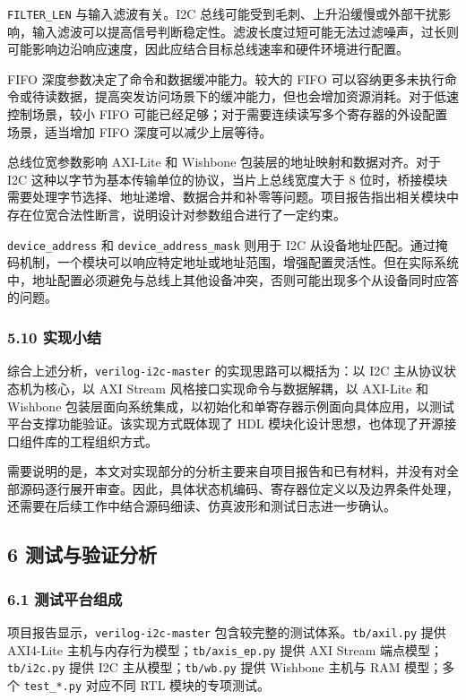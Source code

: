 \texttt{FILTER\_LEN} 与输入滤波有关。I2C 总线可能受到毛刺、上升沿缓慢或外部干扰影响，输入滤波可以提高信号判断稳定性。滤波长度过短可能无法过滤噪声，过长则可能影响边沿响应速度，因此应结合目标总线速率和硬件环境进行配置。

FIFO 深度参数决定了命令和数据缓冲能力。较大的 FIFO 可以容纳更多未执行命令或待读数据，提高突发访问场景下的缓冲能力，但也会增加资源消耗。对于低速控制场景，较小 FIFO 可能已经足够；对于需要连续读写多个寄存器的外设配置场景，适当增加 FIFO 深度可以减少上层等待。

总线位宽参数影响 AXI-Lite 和 Wishbone 包装层的地址映射和数据对齐。对于 I2C 这种以字节为基本传输单位的协议，当片上总线宽度大于 8 位时，桥接模块需要处理字节选择、地址递增、数据合并和补零等问题。项目报告指出相关模块中存在位宽合法性断言，说明设计对参数组合进行了一定约束。

\texttt{device\_address} 和 \texttt{device\_address\_mask} 则用于 I2C 从设备地址匹配。通过掩码机制，一个模块可以响应特定地址或地址范围，增强配置灵活性。但在实际系统中，地址配置必须避免与总线上其他设备冲突，否则可能出现多个从设备同时应答的问题。

\subsubsection{5.10 实现小结}\label{ux5b9eux73b0ux5c0fux7ed3}

综合上述分析，\texttt{verilog-i2c-master} 的实现思路可以概括为：以 I2C 主从协议状态机为核心，以 AXI Stream 风格接口实现命令与数据解耦，以 AXI-Lite 和 Wishbone 包装层面向系统集成，以初始化和单寄存器示例面向具体应用，以测试平台支撑功能验证。该实现方式既体现了 HDL 模块化设计思想，也体现了开源接口组件库的工程组织方式。

需要说明的是，本文对实现部分的分析主要来自项目报告和已有材料，并没有对全部源码逐行展开审查。因此，具体状态机编码、寄存器位定义以及边界条件处理，还需要在后续工作中结合源码细读、仿真波形和测试日志进一步确认。

\subsection{6 测试与验证分析}\label{ux6d4bux8bd5ux4e0eux9a8cux8bc1ux5206ux6790}

\subsubsection{6.1 测试平台组成}\label{ux6d4bux8bd5ux5e73ux53f0ux7ec4ux6210}

项目报告显示，\texttt{verilog-i2c-master} 包含较完整的测试体系。\texttt{tb/axil.py} 提供 AXI4-Lite 主机与内存行为模型；\texttt{tb/axis\_ep.py} 提供 AXI Stream 端点模型；\texttt{tb/i2c.py} 提供 I2C 主从模型；\texttt{tb/wb.py} 提供 Wishbone 主机与 RAM 模型；多个 \texttt{test\_*.py} 对应不同 RTL 模块的专项测试。

